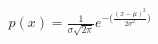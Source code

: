\documentclass[10pt]{article}
\begin{document}
\begin{align*}p(x) = \frac{1}{\sigma\sqrt{2\pi}} e^{-\big(\frac{(x-\mu)^2}{2\sigma^2}\big)}\end{align*}
\end{document}
